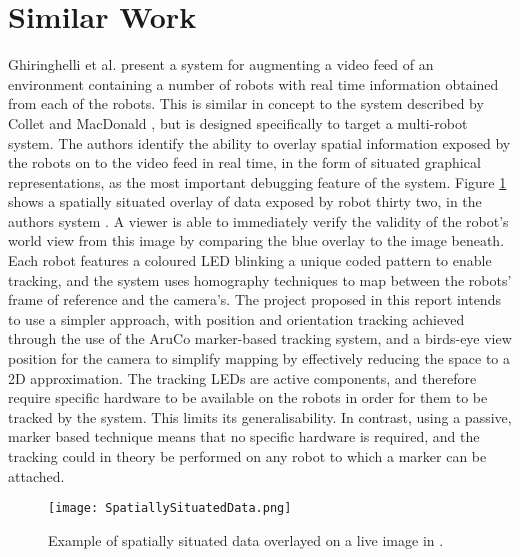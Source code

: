 \section{Similar Work} \label{SimilarWork}
Ghiringhelli et al. \cite{Ghiringhelli:2014} present a system for augmenting a video feed of an environment containing a number of robots with real time information obtained from each of the robots. This is similar in concept to the system described by Collet and MacDonald \cite{Collet:2006}, but is designed specifically to target a multi-robot system. The authors identify the ability to overlay spatial information exposed by the robots on to the video feed in real time, in the form of situated graphical representations, as the most important debugging feature of the system. Figure \ref{fig:SpatiallySituated} shows a spatially situated overlay of data exposed by robot thirty two, in the authors system \cite{Ghiringhelli:2014}. A viewer is able to immediately verify the validity of the robot's world view from this image by comparing the blue overlay to the image beneath. Each robot features a coloured LED blinking a unique coded pattern to enable tracking, and the system uses homography techniques to map between the robots' frame of reference and the camera's. The project proposed in this report intends to use a simpler approach, with position and orientation tracking achieved through the use of the AruCo \cite{Garrido:2014} marker-based tracking system, and a birds-eye view position for the camera to simplify mapping by effectively reducing the space to a 2D approximation. The tracking LEDs are active components, and therefore require specific hardware to be available on the robots in order for them to be tracked by the system. This limits its generalisability. In contrast, using a passive, marker based technique means that no specific hardware is required, and the tracking could in theory be performed on any robot to which a marker can be attached.

\begin{figure}
	\begin{center}
	\texttt{[image: SpatiallySituatedData.png]}
	\decoRule
	\caption[Spatially situation data overlay. Garrido et al. \cite{Ghiringhelli:2014}]{Example of spatially situated data overlayed on a live image in \cite{Ghiringhelli:2014}.}
	\label{fig:SpatiallySituated}
	\end{center}
\end{figure}

